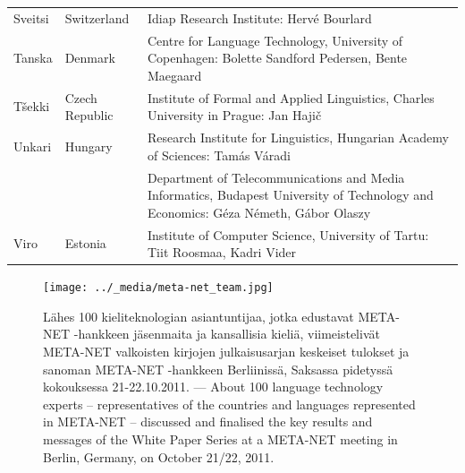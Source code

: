 \begin{longtable}{@{}llp{113mm}@{}}
Sveitsi & \textcolor{grey1}{Switzerland} & Idiap Research Institute: Hervé Bourlard \\ \addlinespace 
Tanska &  \textcolor{grey1}{Denmark} & Centre for Language Technology, University of Copenhagen: \newline Bolette Sandford Pedersen, Bente Maegaard\\ \addlinespace
Tšekki & \textcolor{grey1}{Czech Republic} & Institute of Formal and Applied Linguistics, Charles University in Prague: Jan Hajič \\ \addlinespace
Unkari & \textcolor{grey1}{Hungary} & Research Institute for Linguistics, Hungarian Academy of Sciences: Tamás Váradi\\  \addlinespace
  & & Department of Telecommunications and Media Informatics, Budapest University of Technology and Economics: Géza Németh, Gábor Olaszy\\ \addlinespace
Viro & \textcolor{grey1}{Estonia} & Institute of Computer Science, University of Tartu: Tiit Roosmaa, Kadri Vider
\end{longtable}
\normalsize


\renewcommand*{\figureformat}{}
\renewcommand*{\captionformat}{}

\begin{figure}[htbp]
  \center
  \texttt{[image: ../\_media/meta-net\_team.jpg]}
  \caption{\foreignlanguage{finnish}{Lähes 100 kieliteknologian asiantuntijaa, jotka edustavat META-NET -hankkeen
jäsenmaita ja kansallisia kieliä,  viimeistelivät META-NET valkoisten kirjojen
julkaisusarjan keskeiset tulokset ja sanoman META-NET -hankkeen Berliinissä,
Saksassa pidetyssä kokouksessa 21-22.10.2011.} --- \textcolor{grey1}{About 100 language technology experts -- representatives of the countries and languages represented in META-NET -- discussed and finalised the key results and messages of the White Paper Series at a META-NET meeting in Berlin, Germany, on October 21/22, 2011.}}
  \medskip
\end{figure}

\cleardoublepage

\label{whitepaperseries}

